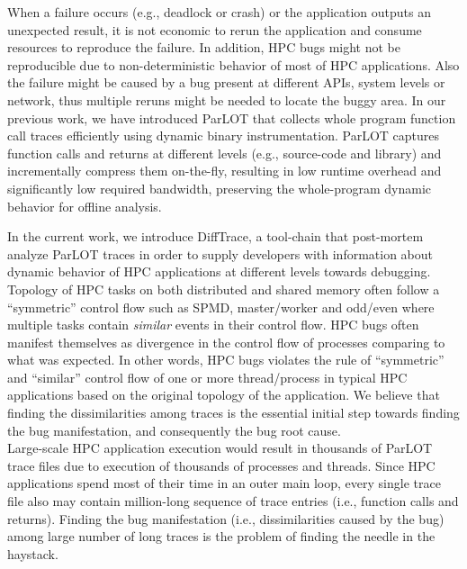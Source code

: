 When a failure occurs (e.g., deadlock or crash) or the application outputs an unexpected result, it is not economic to rerun the application and consume resources to reproduce the failure. In addition, HPC bugs might not be reproducible due to non-deterministic behavior of most of HPC applications. Also the failure might be caused by a bug present at different APIs, system levels or network, thus multiple reruns might be needed to locate the buggy area.
In our previous work\cite{parlot}, we have introduced ParLOT that collects whole program function call traces efficiently using dynamic binary instrumentation.
%
ParLOT captures function calls and returns at different levels (e.g., source-code and library) and incrementally compress them on-the-fly, resulting in low runtime overhead and significantly low required bandwidth, preserving the whole-program dynamic behavior for offline analysis.
%


In the current work, we introduce DiffTrace, a tool-chain that post-mortem analyze ParLOT traces in order to supply developers with information about dynamic behavior of HPC applications at different levels towards debugging. 
%
Topology of HPC tasks on both distributed and shared memory often follow a ``symmetric'' control flow such as SPMD, master/worker and odd/even where multiple tasks contain \textit{similar} events in their control flow. 
%
HPC bugs often manifest themselves as divergence in the control flow of processes comparing to what was expected.
%
In other words, HPC bugs violates the rule of ``symmetric'' and ``similar'' control flow of one or more thread/process in typical HPC applications based on the original topology of the application.
%
We believe that finding the dissimilarities among traces is the essential initial step towards finding the bug manifestation, and consequently the bug root cause.
% 
\\
Large-scale HPC application execution would result in thousands of ParLOT trace files due to execution of thousands of processes and threads.
%
Since HPC applications spend most of their time in an outer main loop, every single trace file also may contain million-long sequence of trace entries (i.e., function calls and returns).
%
Finding the bug manifestation (i.e., dissimilarities caused by the bug) among large number of long traces is the problem of finding the needle in the haystack.

